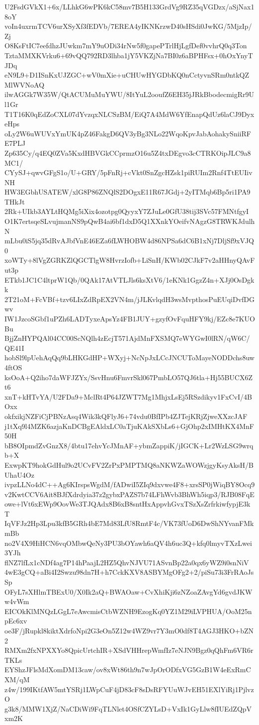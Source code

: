 U2FsdGVkX1+6x/LLhkG6wPK6kC58mv7B5H133GrdVg9RZ35qVGDzx/aSjNax18oY
voIn4uxrmTCV6urXSyXf3fEDVb/7EREA4yIKNKrzwD40sHSdi0JwKG/5MjzIp/Zj
O8KsFtIC7eefdhzJUwkm7mY9uODi34rNw5f0gapePTrlHjLgfDef0vvhrQ0q3Ton
TztaMMXKVrku6+69vQQ792RD3lhba1jY5VKZjNa7BI0z6aBPHFsx+0hOxYnyTJDq
eN9L9+D1ISnKxUJZGC+wV0mXie+uCHUwHYGDbKQ0nCctyvnSRm0ntkQZMlWVNoAQ
ilwAGGk7W35W/QtACUMuMuYWU/8ItYuL2ooufZ6EH35jJRkBbodecmigRr9Ul1Gr
T1T16K0qEdZoCXL07dYvzqxNLCSzBM/EiQ7A4MdW6YfEnapQdUz6laCJ9DyxeHps
oLy2W6uWUVxYmUK4pZ46FakgD6QV3yBg3NLo22WqoKpvJabAohakySniiRFE7PLJ
Zp635Cy/q4EQ0ZVa5KxdHBVGkCCprmzO16u5Z4txDEgvo3cCTRKOipJLC9a8MC1/
CYySJ+qwvGFgS1o/U+GRY/5pFnRj+cVkt0SnZgcHZsk1piRUIm2Rnf4TtEUIivNH
HW3EGbhUSATEW/xlG8P86ZNQlS2DOgxE11R67JGdj+2yITMqb6Bp5ri1PA9THkJt
2Rk+UIkb3AYLtHQMg5iXix4ozotpg0QyyxY7ZJuLe0GfU38tij3SVc57FMNtfgyI
O1K7ertsqeSLvujmanNS9pQwB4ai6bf1dxD5Q1XXnkYOeifvNAgzG8TRWKJdulhN
mLbu0iS5jq35dRvAJbfVnE46EZa6fLWHOBW4d86NPSa6dC6B1xNj7DljSf9xVJQ0
xoWTy+8lVgZGRKZlQGCTlgW8HvrzIofb+LiSnH/KWb02CJkF7v2aHHnyQAvFut3p
ETkb1JC1C4ltprW1Qb/0QAk17AtVTLJls6ksXtV6/1eKNk1GgzZ4n+XJj0OsDgkk
2T21oM+FcVBf+tzv6LIxZdRpEX2VN4m/jJLKvlqdH3wsMvpthosPuEUqiDvfDGwv
IW1JzcoSGbf1uPZh6LADTyxeApsYz4FB1JUY+gzyfOvFquHFY9kj/EZc8e7KUOBu
BjjZnHYPQAl04CC00ScNQlh4zEcjT571AjdMnFXSMQ7eWYGwI0lRN/qW6C/QE41I
hobSl9lpUehAqQq9bLHKGdHP+WXyj+NcNpJxLCcJNCUToMayeNODDchs8uw4ftOS
ksOoA+Q2iho7daWFJZYx/SsvHnu6FmvrSkl067PmbLO57QJ6tla+Hj55BUCX6Zt6
xnT+kHTvYA/U2FDa9+MclRt4P64JZWT7Mg1MhjxLsEj5RSzdikyv1FxCvI/4BOxx
okfxikjNZFiCjPBNzAsq4Wik3kQFlyJ6+74vdu0BfIPb4ZJTejKRjZjweXXzcJAF
j1tXq9l4MZK6azjaKnDCBgEAldxLC0aTjuKAkSXbLs6+GjOhp2xIMHtKX4MnF50H
bB8OIpmdZvGnzX8/4btu17ehvYcJMnAF+ybmZappiK/jIGCK+Lr2WzLSG9wrqb+X
ExwpKT9hokGdHul9o2UCvFV2ZrPxPMPTMQ8aNKWZaWOWzjgyKsyAksH/BUhaU4Oz
ivpzLLNo4dC++Ag6KIrspsWgdM/fADwiI5ZIq9dxvwe4F8+xrsSP0jWiqBY8Ocq9
v2KwtCCV6Ait8BJfXdrdyia37z2gybxPAZS7b74LFhWvb3BhWh5iqp3/RJB08FqE
owe+lVt6xEWp9OovWe3TJQAdx8B6xB8sntHxAppvhGvxTSzXsZrfrkiwfypjE3kT
IqVFJz2Hp3Lpu3kfB5GRh4bE7Md83LfU8RmtF4c/VK73fUoD6DwShNYvanFMkmBb
no2V4X9HiHCN6vqOMbwQeNy3PU3bOYawh6aQV4h6uc3Q+kfq0lmyvTXzLwei3YJh
flNZ7lfLx1cNDf4ag7P14hPaajL2HZ5QhvNJVU71ASvnBp22a0qx6yWZ9i0snNiV
4wE3gCQ+aBi4I2Swzu98dn7H+h7CckKXV8ASBYMgOFg2+2/piSu73i3FrRAoJsSp
OFyL7sXHlmTBExU0/X0Ik2aQ+BWAOaw+CvXhiKji6zNZoaZAvgYd6gvdJKWw4vWm
EICOkKlMNQzLGgL7eAwcmisCtbWZNH9EzogKq0YZ1M29iLVPHUA/OoM25npEc6xv
oe3F/jRupkl8kiktXdrfoNpi2G3eOn5Z12w4WZ9vr7Y3mO0df8T4AGJ3HKO+bZN2
RMXm2fxNPXXYo8QpicUrtchIR+XSdVHHrepWmfIz7eNJN9Bgz0qQhFm6VR6rTKLs
EYShzJFlsMdXomDM13caw/ov8xWt86th9n7wJpOrODfxVG5GzB1W4eExRmCXM/qM
z4w/199IKtfAW5mtYSRj1LWpCuF4jD83cF8sDsRFYUuWJvEH51EXlYiRj1PjlvzO
g3k8/MMW1XjZ/NaCDiWi9FqTLNlet4OSfCZYLsD+VxIk1GyLlw8fIUEdZQpVxm2K
